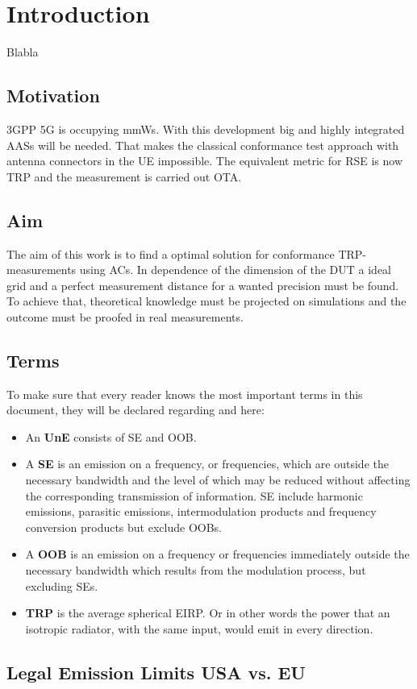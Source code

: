 \chapter{Introduction}

Blabla \cite{2018arXiv180310993F} \cite{keysightota} \cite{inproceedings} \cite{6375745} \cite{balanis} \cite{19510} \cite{1446714} \\

\section{Motivation}

\ac{3GPP} \ac{5G} is occupying \acp{mmW}. With this development big and highly integrated  \acp{AAS} will be needed. That makes the classical conformance test approach with antenna connectors in the \ac{UE} impossible. The equivalent metric for \ac{RSE} is now \ac{TRP} and the measurement is carried out \ac{OTA}.

\section{Aim}

The aim of this work is to find a optimal solution for conformance  \ac{TRP}-measurements using \acp{AC}. In dependence of the dimension of the \ac{DUT} a ideal grid and a perfect measurement distance for a wanted precision must be found. To achieve that, theoretical knowledge must be projected on simulations and the outcome must be proofed in real measurements.

\section{Terms}

To make sure that every reader knows the most important terms in this document, they will be declared regarding \cite{seitur} and \cite{ctiaat} here:

\begin{itemize}
\item An \textbf{\acf{UnE}} consists of \acl{SE} and \acl{OOB}.
\item A \textbf{\acf{SE}} is an emission on a frequency, or frequencies, which are outside the necessary bandwidth and the level of which may be reduced without affecting the corresponding transmission of information. \acl{SE} include harmonic
emissions, parasitic emissions, intermodulation products and frequency conversion products but exclude \aclp{OOB}.
\item A \textbf{\acf{OOB}} is an emission on a frequency or frequencies immediately outside the necessary bandwidth which results from the modulation process, but excluding \aclp{SE}.
\item \textbf{\acf{TRP}} is the average spherical \ac{EIRP}. Or in other words the power that an isotropic radiator, with the same input, would emit in every direction.
\end{itemize}

\section{Legal Emission Limits USA vs. EU}

\cite{ceptercrec}\cite{ansi} \cite{fcc}

\label{sec:legem}